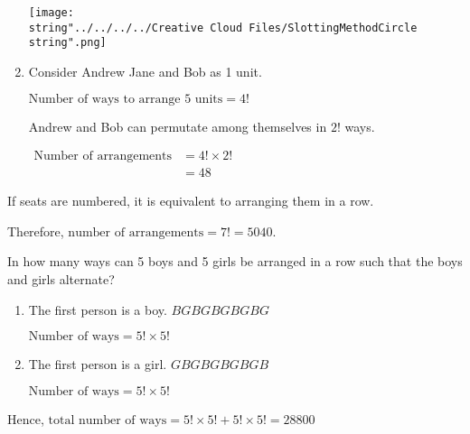 \documentclass[11pt,a4paper]{book}
\begin{document}
\begin{example}
\begin{enumerate}[label=(\alph*)]
\begin{minipage}[t]{.6\textwidth}
\end{minipage}
\begin{minipage}[t]{.4\textwidth}
\begin{center}
\texttt{[image: \\string"../../../../Creative Cloud Files/SlottingMethodCircle\\string".png]}
\par\end{center}

\end{minipage}

\item  Consider Andrew Jane and Bob as 1 unit.

$\text{Number of ways to arrange 5 units}=4!$

Andrew and Bob can permutate among themselves in $2!$ ways.

$
\begin{aligned}
\text{Number of arrangements} & =4!\times2!\\
 & =48
\end{aligned}
$

\end{enumerate}

If seats are numbered, it is equivalent to arranging them in a row.

Therefore, $\text{number of arrangements}=7!=5040$.

\end{example}

\newpage

\begin{example}

In how many ways can 5 boys and 5 girls be arranged in a row such
that the boys and girls alternate?

\Solution

\begin{enumerate}[label=Case \arabic*:,leftmargin=1.5cm] 

\item The first person is a boy. \hspace{1cm}$BGBGBGBGBG$

$\text{Number of ways}=5!\times5!$

\item The first person is a girl. \hspace{1cm}$GBGBGBGBGB$

$\text{Number of ways}=5!\times5!$

\end{enumerate}

Hence, $\text{total number of ways}=5!\times5!+5!\times5!=28800$

\end{example}
\end{document}
